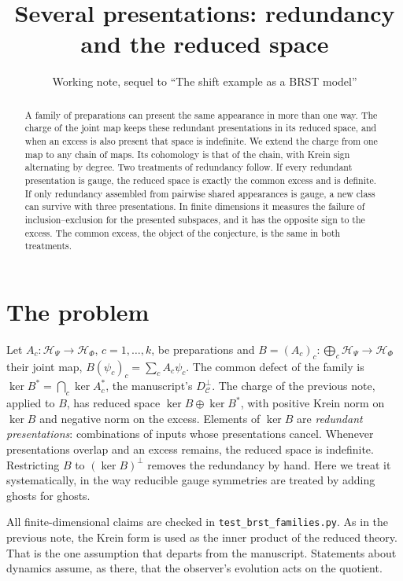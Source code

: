 \documentclass[11pt]{article}
\title{Several presentations: redundancy and the reduced space}
\author{Working note, sequel to ``The shift example as a BRST model''}
\date{}
\theoremstyle{remark}
\newcommand{\HP}{\mathcal H_\Psi}
\newcommand{\HF}{\mathcal H_\Phi}
\begin{document}
\maketitle

\begin{abstract}
\noindent
A family of preparations can present the same appearance in more than one way. The charge of the joint map keeps these redundant presentations in its reduced space, and when an excess is also present that space is indefinite. We extend the charge from one map to any chain of maps. Its cohomology is that of the chain, with Krein sign alternating by degree. Two treatments of redundancy follow. If every redundant presentation is gauge, the reduced space is exactly the common excess and is definite. If only redundancy assembled from pairwise shared appearances is gauge, a new class can survive with three presentations. In finite dimensions it measures the failure of inclusion--exclusion for the presented subspaces, and it has the opposite sign to the excess. The common excess, the object of the conjecture, is the same in both treatments.
\end{abstract}

\section{The problem}

Let $A_c:\HP\to\HF$, $c=1,\dots,k$, be preparations and $B=(A_c)_c:\bigoplus_c\HP\to\HF$ their joint map, $B(\psi_c)_c=\sum_cA_c\psi_c$. The common defect of the family is $\ker B^*=\bigcap_c\ker A_c^*$, the manuscript's $D_{\mathcal C}^\perp$. The charge of the previous note, applied to $B$, has reduced space $\ker B\oplus\ker B^*$, with positive Krein norm on $\ker B$ and negative norm on the excess. Elements of $\ker B$ are \emph{redundant presentations}: combinations of inputs whose presentations cancel. Whenever presentations overlap and an excess remains, the reduced space is indefinite. Restricting $B$ to $(\ker B)^\perp$ removes the redundancy by hand. Here we treat it systematically, in the way reducible gauge symmetries are treated by adding ghosts for ghosts.

All finite-dimensional claims are checked in \texttt{test\_brst\_families.py}. As in the previous note, the Krein form is used as the inner product of the reduced theory. That is the one assumption that departs from the manuscript. Statements about dynamics assume, as there, that the observer's evolution acts on the quotient.
\end{document}
